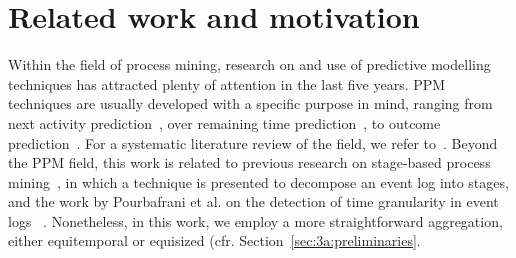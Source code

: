 \section{Related work and motivation}\label{sec:2:motivation}
Within the field of process mining, research on and use of predictive modelling techniques has attracted plenty of attention in the last five years. PPM techniques are usually developed with a specific purpose in mind, ranging from next activity prediction~\cite{evermann2017predicting,DBLP:conf/caise/TaxVRD17}, over remaining time prediction~\cite{verenich2019survey}, to outcome prediction~\cite{kratsch2020machine}. For a systematic literature review of the field, we refer to~\cite{neu2021systematic}. Beyond the PPM field, this work is related to previous research on stage-based process mining~\cite{nguyen2016business}, in which a technique is presented to decompose an event log into stages, and the work by Pourbafrani et al. on the detection of time granularity in event logs ~\cite{pourbafrani2020}. Nonetheless, in this work, we employ a more straightforward aggregation, either equitemporal or equisized (cfr. Section~\ref{sec:3a:preliminaries}. 

